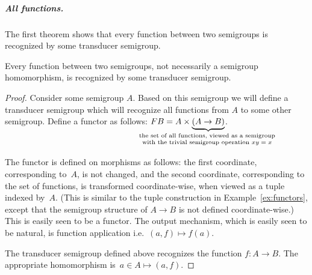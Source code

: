 \subparagraph{All functions.} The first theorem shows that every function between two semigroups is recognized by some transducer semigroup.

\begin{theorem}\label{thm:all-functions} 
     Every function    between two semigroups, not necessarily a semigroup homomorphism, is recognized  by some transducer semigroup.
\end{theorem}
\begin{proof}
    Consider some semigroup $A$. Based on this semigroup we will define a transducer semigroup which will recognize all functions from $A$ to some other semigroup. Define  a functor as follows: $\functor B = A \times \displaystyle\myunderbrace{(A \to B)}{the set of all  functions, viewed as a semigroup \\ 
with the trivial semigroup operation $xy = x$}$.

The functor is defined on morphisms
as follows: the first coordinate, corresponding to~$A$, is not changed, and the second coordinate, corresponding to the set of functions, is transformed   coordinate-wise, when viewed as a tuple indexed by~$A$. (This is similar to the tuple construction in Example~\ref{ex:functors}, except that the semigroup structure of $A \to B$ is not defined coordinate-wise.)  This is easily seen to be a functor. The output mechanism, which is easily seen to be natural, is function application i.e.~$(a,f) \mapsto f(a)$.

The transducer semigroup defined above recognizes the function $f : A \to B$. The appropriate homomorphism  is~$a \in A  \mapsto  (a,f)$.
\end{proof}

